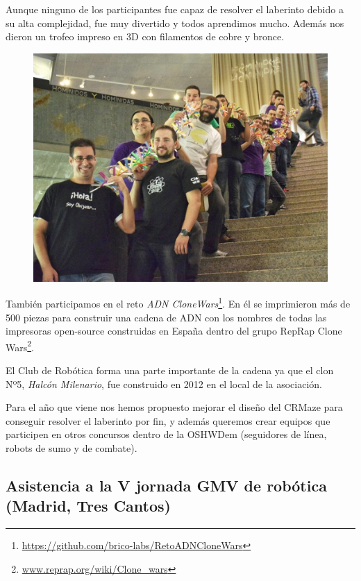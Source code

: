 \documentclass[12pt,twoside]{report}
\begin{document}
Aunque ninguno de los participantes fue capaz de resolver el laberinto debido a su alta complejidad, fue muy divertido y todos aprendimos mucho. Además nos dieron un trofeo impreso en 3D con filamentos de cobre y bronce.


\begin{figure}\centering
    \includegraphics[scale=0.2]{fotos/2015_OSHWDem_cadenaADNcloneWars}
    \caption*{}
\end{figure}
También participamos en el reto \emph{ADN CloneWars}\footnote{\url{https://github.com/brico-labs/RetoADNCloneWars}}. En él se imprimieron más de 500 piezas para construir una cadena de ADN con los nombres de todas las impresoras open-source construidas en España dentro del grupo RepRap Clone Wars\footnote{\url{www.reprap.org/wiki/Clone_wars}}.

El Club de Robótica forma una parte importante de la cadena ya que el clon Nº5, \emph{Halcón Milenario}, fue construido en 2012 en el local de la asociación.

Para el año que viene nos hemos propuesto mejorar el diseño del CRMaze para conseguir resolver el laberinto por fin, y además queremos crear equipos que participen en otros concursos dentro de la OSHWDem (seguidores de línea, robots de sumo y de combate).



\subsection{Asistencia a la V jornada GMV de robótica (Madrid, Tres Cantos)}
\end{document}
